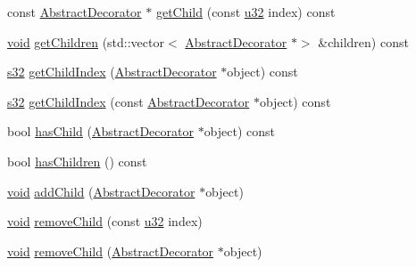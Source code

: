 \begin{DoxyCompactItemize}
\item 
const \mbox{\hyperlink{classnjli_1_1_abstract_decorator}{Abstract\+Decorator}} $\ast$ \mbox{\hyperlink{classnjli_1_1_abstract_decorator_a47f431982092b823d925ac031491d344}{get\+Child}} (const \mbox{\hyperlink{_util_8h_a10e94b422ef0c20dcdec20d31a1f5049}{u32}} index) const
\item 
\mbox{\hyperlink{_thread_8h_af1e856da2e658414cb2456cb6f7ebc66}{void}} \mbox{\hyperlink{classnjli_1_1_abstract_decorator_a7bfa660dbfaeed3531c9041569bc23b3}{get\+Children}} (std\+::vector$<$ \mbox{\hyperlink{classnjli_1_1_abstract_decorator}{Abstract\+Decorator}} $\ast$$>$ \&children) const
\item 
\mbox{\hyperlink{_util_8h_aa62c75d314a0d1f37f79c4b73b2292e2}{s32}} \mbox{\hyperlink{classnjli_1_1_abstract_decorator_ad34934f1a89ae3a586af2ce17ab598d1}{get\+Child\+Index}} (\mbox{\hyperlink{classnjli_1_1_abstract_decorator}{Abstract\+Decorator}} $\ast$object) const
\item 
\mbox{\hyperlink{_util_8h_aa62c75d314a0d1f37f79c4b73b2292e2}{s32}} \mbox{\hyperlink{classnjli_1_1_abstract_decorator_a87aedeab22233d8e57b870abbaa61941}{get\+Child\+Index}} (const \mbox{\hyperlink{classnjli_1_1_abstract_decorator}{Abstract\+Decorator}} $\ast$object) const
\item 
bool \mbox{\hyperlink{classnjli_1_1_abstract_decorator_ad483ceb78102e1a2ac489d2d5d58674c}{has\+Child}} (\mbox{\hyperlink{classnjli_1_1_abstract_decorator}{Abstract\+Decorator}} $\ast$object) const
\item 
bool \mbox{\hyperlink{classnjli_1_1_abstract_decorator_a64c272cd1d9c212dacad178db49e2b20}{has\+Children}} () const
\item 
\mbox{\hyperlink{_thread_8h_af1e856da2e658414cb2456cb6f7ebc66}{void}} \mbox{\hyperlink{classnjli_1_1_abstract_decorator_a6b94b03ed7bcf783795e02a628d46bca}{add\+Child}} (\mbox{\hyperlink{classnjli_1_1_abstract_decorator}{Abstract\+Decorator}} $\ast$object)
\item 
\mbox{\hyperlink{_thread_8h_af1e856da2e658414cb2456cb6f7ebc66}{void}} \mbox{\hyperlink{classnjli_1_1_abstract_decorator_a907a417691a2e3bfef5fd7d0f0eb0417}{remove\+Child}} (const \mbox{\hyperlink{_util_8h_a10e94b422ef0c20dcdec20d31a1f5049}{u32}} index)
\item 
\mbox{\hyperlink{_thread_8h_af1e856da2e658414cb2456cb6f7ebc66}{void}} \mbox{\hyperlink{classnjli_1_1_abstract_decorator_a3de9eaa0ff8afc7ccd4378efdaadc191}{remove\+Child}} (\mbox{\hyperlink{classnjli_1_1_abstract_decorator}{Abstract\+Decorator}} $\ast$object)
$$
\end{DoxyCompactItemize}
